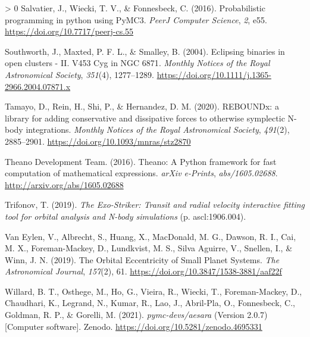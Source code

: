 \documentclass[10pt,a4paper,onecolumn]{article}
\newlength{\cslhangindent}
\newenvironment{CSLReferences}[3] %
 {%
  \setlength{\parindent}{0pt}
  \ifodd #1 \everypar{\setlength{\hangindent}{\cslhangindent}}\ignorespaces\fi
  \ifnum #2 > 0
  \setlength{\parskip}{#2\baselineskip}
  \fi
 }%
 {}
\begin{document}
\begin{CSLReferences}{1}{0}
\leavevmode\hypertarget{ref-pymc3}{}%
Salvatier, J., Wiecki, T. V., \& Fonnesbeck, C. (2016). Probabilistic
programming in python using PyMC3. \emph{PeerJ Computer Science},
\emph{2}, e55. \url{https://doi.org/10.7717/peerj-cs.55}

\leavevmode\hypertarget{ref-southworth04}{}%
Southworth, J., Maxted, P. F. L., \& Smalley, B. (2004). {Eclipsing
binaries in open clusters - II. V453 Cyg in NGC 6871}. \emph{Monthly
Notices of the Royal Astronomical Society}, \emph{351}(4), 1277--1289.
\url{https://doi.org/10.1111/j.1365-2966.2004.07871.x}

\leavevmode\hypertarget{ref-tamayo20}{}%
Tamayo, D., Rein, H., Shi, P., \& Hernandez, D. M. (2020). {REBOUNDx: a
library for adding conservative and dissipative forces to otherwise
symplectic N-body integrations}. \emph{Monthly Notices of the Royal
Astronomical Society}, \emph{491}(2), 2885--2901.
\url{https://doi.org/10.1093/mnras/stz2870}

\leavevmode\hypertarget{ref-theano}{}%
Theano Development Team. (2016). {Theano: A {Python} framework for fast
computation of mathematical expressions}. \emph{arXiv e-Prints},
\emph{abs/1605.02688}. \url{http://arxiv.org/abs/1605.02688}

\leavevmode\hypertarget{ref-trifonov19}{}%
Trifonov, T. (2019). \emph{{The Exo-Striker: Transit and radial velocity
interactive fitting tool for orbital analysis and N-body simulations}}
(p. ascl:1906.004).

\leavevmode\hypertarget{ref-vaneylen19}{}%
Van Eylen, V., Albrecht, S., Huang, X., MacDonald, M. G., Dawson, R. I.,
Cai, M. X., Foreman-Mackey, D., Lundkvist, M. S., Silva Aguirre, V.,
Snellen, I., \& Winn, J. N. (2019). {The Orbital Eccentricity of Small
Planet Systems}. \emph{The Astronomical Journal}, \emph{157}(2), 61.
\url{https://doi.org/10.3847/1538-3881/aaf22f}

\leavevmode\hypertarget{ref-aesara}{}%
Willard, B. T., Osthege, M., Ho, G., Vieira, R., Wiecki, T.,
Foreman-Mackey, D., Chaudhari, K., Legrand, N., Kumar, R., Lao, J.,
Abril-Pla, O., Fonnesbeck, C., Goldman, R. P., \& Gorelli, M. (2021).
\emph{{pymc-devs/aesara}} (Version 2.0.7) {[}Computer software{]}.
Zenodo. \url{https://doi.org/10.5281/zenodo.4695331}

\end{CSLReferences}
\end{document}
